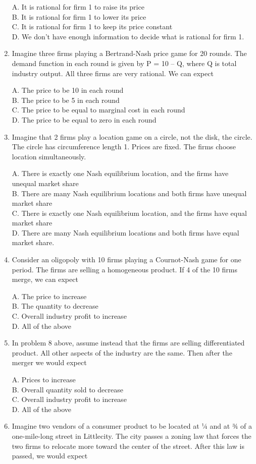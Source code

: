 \documentclass[
]{book}
\begin{document}
\begin{enumerate}
  A. It is rational for firm 1 to raise its price\\
  B. It is rational for firm 1 to lower its price\\
  C. It is rational for firm 1 to keep its price constant\\
  D. We don't have enough information to decide what is rational for firm 1.
\item
  Imagine three firms playing a Bertrand-Nash price game for 20 rounds. The demand function in each round is given by P = 10 -- Q, where Q is total industry output. All three firms are very rational. We can expect

  A. The price to be 10 in each round\\
  B. The price to be 5 in each round\\
  C. The price to be equal to marginal cost in each round\\
  D. The price to be equal to zero in each round
\item
  Imagine that 2 firms play a location game on a circle, not the disk, the circle. The circle has circumference length 1. Prices are fixed. The firms choose location simultaneously.

  A. There is exactly one Nash equilibrium location, and the firms have unequal market share\\
  B. There are many Nash equilibrium locations and both firms have unequal market share\\
  C. There is exactly one Nash equilibrium location, and the firms have equal market share\\
  D. There are many Nash equilibrium locations and both firms have equal market share.
\item
  Consider an oligopoly with 10 firms playing a Cournot-Nash game for one period. The firms are selling a homogeneous product. If 4 of the 10 firms merge, we can expect

  A. The price to increase\\
  B. The quantity to decrease\\
  C. Overall industry profit to increase\\
  D. All of the above
\item
  In problem 8 above, assume instead that the firms are selling differentiated product. All other aspects of the industry are the same. Then after the merger we would expect

  A. Prices to increase\\
  B. Overall quantity sold to decrease\\
  C. Overall industry profit to increase\\
  D. All of the above
\item
  Imagine two vendors of a consumer product to be located at ¼ and at ¾ of a one-mile-long street in Littlecity. The city passes a zoning law that forces the two firms to relocate more toward the center of the street. After this law is passed, we would expect


\end{enumerate}
\end{document}
